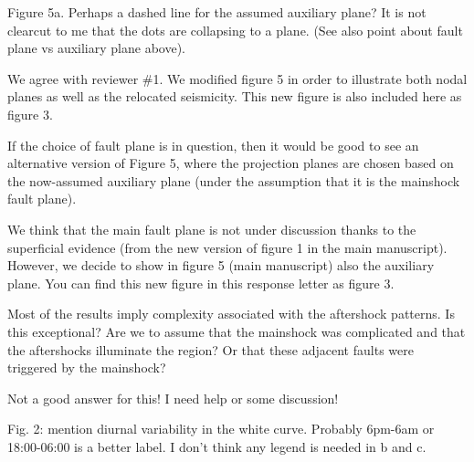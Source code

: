 \documentclass[10pt]{extarticle}
\begin{document}
\begin{ReviewerComment}{1}
\noindent 
Figure 5a. Perhaps a dashed line for the assumed auxiliary plane? It is not clearcut to me that the dots are collapsing to a plane. (See also point about fault plane vs auxiliary plane above).
\end{ReviewerComment}


\begin{Answer}
We agree with reviewer \#1. We modified figure 5 in order to  illustrate both nodal planes as well as the relocated seismicity. This new figure is also included here as figure 3.
 \WorkInProgressRevTask
\end{Answer}
%
%


\begin{ReviewerComment}{1}
\noindent 
If the choice of fault plane is in question, then it would be good to see an alternative version of Figure 5, where the projection planes are chosen based on the now-assumed auxiliary plane (under the assumption that it is the mainshock fault plane).

\end{ReviewerComment}


\begin{Answer}
We think that the main fault plane is not under discussion thanks to the superficial evidence (from the new version of figure 1 in the main manuscript). However, we decide to show in figure 5 (main manuscript) also the auxiliary plane. You can find this new figure in this response letter as figure 3.
 \WorkInProgressRevTask
\end{Answer}
%
%


\begin{ReviewerComment}{1}
\noindent 
Most of the results imply complexity associated with the aftershock patterns. Is this exceptional? Are we to assume that the mainshock was complicated and that the aftershocks illuminate the region? Or that these adjacent faults were triggered by the mainshock?

\end{ReviewerComment}


\begin{Answer}
{\LARGE Not a good answer for this! I need help or some discussion!}
 \WorkInProgressRevTask
\end{Answer}
%
%




\begin{ReviewerComment}{1}
\noindent 
Fig. 2: mention diurnal variability in the white curve. Probably 6pm-6am or 18:00-06:00 is a better label. I don't think any legend is needed in b and c.

\end{ReviewerComment}
\end{document}
